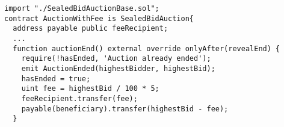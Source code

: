 \begin{lstlisting}[language=Solidity]
import "./SealedBidAuctionBase.sol";
contract AuctionWithFee is SealedBidAuction{
  address payable public feeRecipient;
  ... 
  function auctionEnd() external override onlyAfter(revealEnd) {
    require(!hasEnded, 'Auction already ended');
    emit AuctionEnded(highestBidder, highestBid);
    hasEnded = true;
    uint fee = highestBid / 100 * 5;
    feeRecipient.transfer(fee);
    payable(beneficiary).transfer(highestBid - fee);
  }
\end{lstlisting}